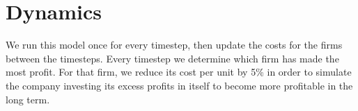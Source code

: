 \documentclass[11pt]{article}
\begin{document}
\section{Dynamics}
We run this model once for every timestep, then update the costs for the firms
between the timesteps. Every timestep we determine which firm has made the most
profit. For that firm, we reduce its cost per unit by 5\% in order to simulate
the company investing its excess profits in itself to become more profitable in
the long term. 
\end{document}
